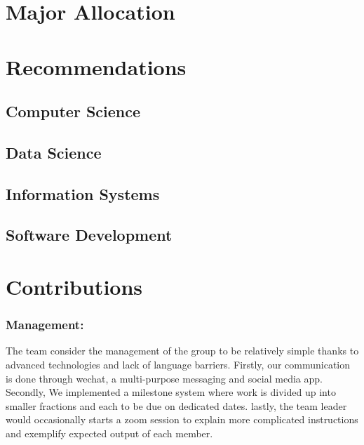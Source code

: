 \documentclass{article}
\begin{document}
	\pagebreak
\section{Major Allocation}
	\begin{center}
	\end{center}
\pagebreak

\section{Recommendations}
	\subsection{Computer Science}
		
		\pagebreak
	\subsection{Data Science}
		
		\pagebreak
	\subsection{Information Systems}
		
		\pagebreak
	\subsection{Software Development}
		
		\pagebreak

\section{Contributions}
	\subsubsection{Management:}
	The team consider the management of the group to be relatively simple thanks to advanced technologies and lack of language barriers. Firstly, our communication is done through wechat, a multi-purpose messaging and social media app. Secondly, We implemented a milestone system where work is divided up into smaller fractions and each to be due on dedicated dates. lastly, the team leader would occasionally starts a zoom session to explain more complicated instructions and exemplify expected output of each member.
\end{document}
